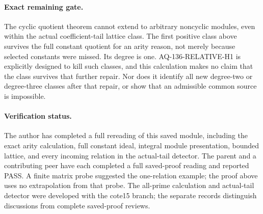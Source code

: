 \paragraph{Exact remaining gate.}
The cyclic quotient theorem cannot extend to arbitrary noncyclic
modules, even within the actual coefficient-tail lattice class.
The first positive class above survives the full constant quotient
for an arity reason, not merely because selected constants were
missed.  Its degree is one.  AQ-136-RELATIVE-H1 is explicitly
designed to kill such classes, and this calculation makes no
claim that the class survives that further repair.  Nor does it
identify all new degree-two or degree-three classes after that
repair, or show that an admissible common source is impossible.

\paragraph{Verification status.}
The author has completed a full rereading of this saved module,
including the exact arity calculation, full constant ideal, integral
module presentation, bounded lattice, and every incoming relation
in the actual-tail detector.  The parent and a contributing peer
have each completed a full saved-proof reading and reported PASS.  A finite matrix probe suggested
the one-relation example;
the proof above uses no extrapolation from that probe.  The all-prime
calculation and actual-tail detector were developed with the
cote15 branch; the separate records distinguish discussions from
complete saved-proof reviews.
